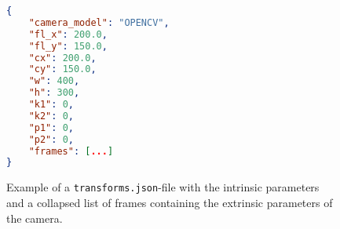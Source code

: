 \begin{figure}[ht]
\centering
\begin{lstlisting}[language=json,linewidth=0.9\linewidth]
{
    "camera_model": "OPENCV",
    "fl_x": 200.0,
    "fl_y": 150.0,
    "cx": 200.0,
    "cy": 150.0,
    "w": 400,
    "h": 300,
    "k1": 0,
    "k2": 0,
    "p1": 0,
    "p2": 0,
    "frames": [...]
}
\end{lstlisting}
\caption{Example of a \texttt{transforms.json}-file with the intrinsic parameters and a collapsed list of frames containing the extrinsic parameters of the camera.}
\label{code:transform-examples}
\end{figure}
